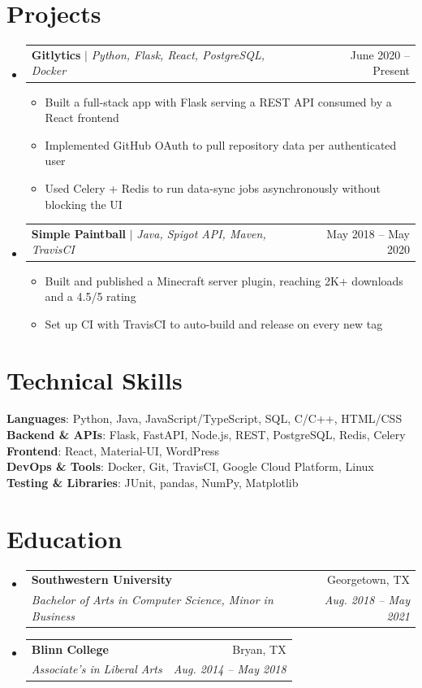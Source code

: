 \documentclass[letterpaper,11pt]{article}
\makeatletter
\newcommand{\resumeItem}[1]{
  \item\small{
    {#1 \vspace{-2pt}}
  }
}
\newcommand{\resumeSubheading}[4]{
  \vspace{-2pt}\item
    \begin{tabular*}{0.97\textwidth}[t]{l@{\extracolsep{\fill}}r}
      \textbf{#1} & #2 \\
      \textit{\small#3} & \textit{\small #4} \\
    \end{tabular*}\vspace{-7pt}
}
\newcommand{\resumeProjectHeading}[2]{
    \item
    \begin{tabular*}{0.97\textwidth}{l@{\extracolsep{\fill}}r}
      \small#1 & #2 \\
    \end{tabular*}\vspace{-7pt}
}
\newcommand{\resumeSubHeadingListStart}{\begin{itemize}[leftmargin=0.15in, label={}]}
\newcommand{\resumeSubHeadingListEnd}{\end{itemize}}
\newcommand{\resumeItemListStart}{\begin{itemize}}
\newcommand{\resumeItemListEnd}{\end{itemize}\vspace{-5pt}}
\makeatother
\begin{document}
\section{Projects}
    \resumeSubHeadingListStart
      \resumeProjectHeading
          {\textbf{Gitlytics} $|$ \emph{Python, Flask, React, PostgreSQL, Docker}}{June 2020 -- Present}
          \resumeItemListStart
            \resumeItem{Built a full-stack app with Flask serving a REST API consumed by a React frontend}
            \resumeItem{Implemented GitHub OAuth to pull repository data per authenticated user}
            \resumeItem{Used Celery + Redis to run data-sync jobs asynchronously without blocking the UI}
          \resumeItemListEnd
      \resumeProjectHeading
          {\textbf{Simple Paintball} $|$ \emph{Java, Spigot API, Maven, TravisCI}}{May 2018 -- May 2020}
          \resumeItemListStart
            \resumeItem{Built and published a Minecraft server plugin, reaching 2K+ downloads and a 4.5/5 rating}
            \resumeItem{Set up CI with TravisCI to auto-build and release on every new tag}
          \resumeItemListEnd
    \resumeSubHeadingListEnd

\section{Technical Skills}
 \begin{itemize}[leftmargin=0.15in, label={}]
    \small{\item{
     \textbf{Languages}{: Python, Java, JavaScript/TypeScript, SQL, C/C++, HTML/CSS} \\
     \textbf{Backend \& APIs}{: Flask, FastAPI, Node.js, REST, PostgreSQL, Redis, Celery} \\
     \textbf{Frontend}{: React, Material-UI, WordPress} \\
     \textbf{DevOps \& Tools}{: Docker, Git, TravisCI, Google Cloud Platform, Linux} \\
     \textbf{Testing \& Libraries}{: JUnit, pandas, NumPy, Matplotlib}
    }}
 \end{itemize}

\section{Education}
  \resumeSubHeadingListStart
    \resumeSubheading
      {Southwestern University}{Georgetown, TX}
      {Bachelor of Arts in Computer Science, Minor in Business}{Aug. 2018 -- May 2021}
    \resumeSubheading
      {Blinn College}{Bryan, TX}
      {Associate's in Liberal Arts}{Aug. 2014 -- May 2018}
  \resumeSubHeadingListEnd
\end{document}
